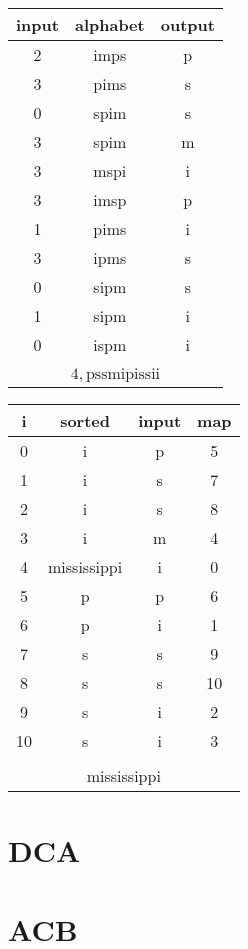 \begin{figure*}
  \begin{center}
  \begin{tabular}{c|c|c}
    input & alphabet & output \\
    \hline
    2 & imps & p \\
    3 & pims & s \\
    0 & spim & s \\
    3 & spim & m \\
    3 & mspi & i \\
    3 & imsp & p \\
    1 & pims & i \\
    3 & ipms & s \\
    0 & sipm & s \\
    1 & sipm & i \\
    0 & ispm & i \\
    \multicolumn{3}{c}{} \\
    \multicolumn{3}{c}{$4, \text{pssmipissii}$} \\
  \end{tabular}
  \hspace*{0.5cm}
  \begin{tabular}{c|c|c|c}
    i & sorted & input & map \\
    \hline
    0 & i & p & 5 \\
    1 & i & s & 7 \\
    2 & i & s & 8 \\
    3 & i & m & 4 \\
    4 & mississippi & i & 0 \\
    5 & p & p & 6 \\
    6 & p & i & 1 \\
    7 & s & s & 9 \\
    8 & s & s & 10 \\
    9 & s & i & 2 \\
    10 & s & i & 3 \\
    \multicolumn{4}{c}{} \\
    \multicolumn{4}{c}{mississippi} \\
  \end{tabular}
  \end{center}
  \caption{$BWC^{R}(4, (2,3,0,3,3,3,1,3,0,1,0))$}
\end{figure*}

\section{DCA}

\section{ACB}
